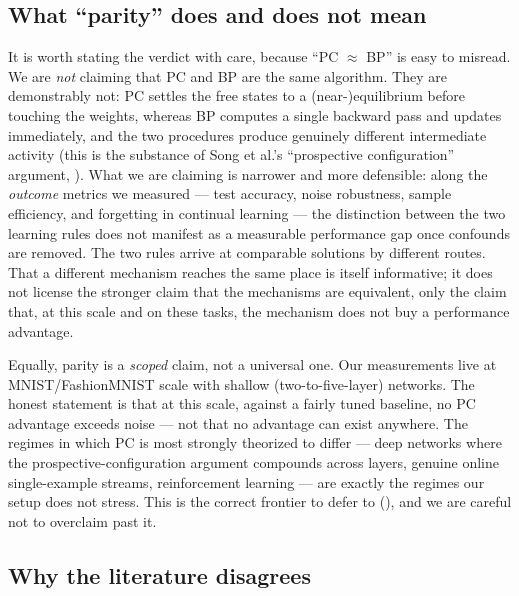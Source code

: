 \subsection{What ``parity'' does and does not mean}

It is worth stating the verdict with care, because ``PC $\approx$ BP'' is easy to misread. We are
\emph{not} claiming that PC and BP are the same algorithm. They are demonstrably not: PC settles the
free states to a (near-)equilibrium before touching the weights, whereas BP computes a single
backward pass and updates immediately, and the two procedures produce genuinely different
intermediate activity (this is the substance of Song et al.'s ``prospective configuration''
argument, \citealp{song2024prospective}). What we are claiming is narrower and more defensible:
along the \emph{outcome} metrics we measured --- test accuracy, noise robustness, sample efficiency,
and forgetting in continual learning --- the distinction between the two learning rules does not
manifest as a measurable performance gap once confounds are removed. The two rules arrive at
comparable solutions by different routes. That a different mechanism reaches the same place is itself
informative; it does not license the stronger claim that the mechanisms are equivalent, only the
claim that, at this scale and on these tasks, the mechanism does not buy a performance advantage.

Equally, parity is a \emph{scoped} claim, not a universal one. Our measurements live at
MNIST/FashionMNIST scale with shallow (two-to-five-layer) networks. The honest statement is that at
this scale, against a fairly tuned baseline, no PC advantage exceeds noise --- not that no advantage
can exist anywhere. The regimes in which PC is most strongly theorized to differ --- deep networks
where the prospective-configuration argument compounds across layers, genuine online single-example
streams, reinforcement learning --- are exactly the regimes our setup does not stress. This is the
correct frontier to defer to (), and we are careful not to overclaim past it.

\subsection{Why the literature disagrees}

